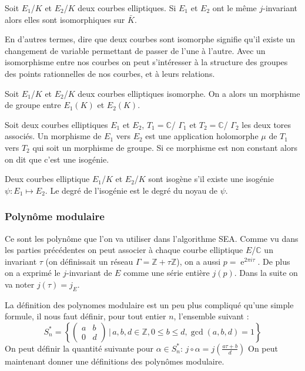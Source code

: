 \documentclass{article}
\DeclareMathOperator{\e}{e}
\begin{document}
\begin{defi}
Soit $E_1$/$K$ et $E_2$/$K$ deux courbes elliptiques. Si $E_1$ et $E_2$ ont le même $j$-invariant alors elles sont isomorphiques sur $\bar{K}$. 
\end{defi}
En d'autres termes, dire que deux courbes sont isomorphe signifie qu'il existe un changement de variable permettant de passer de l'une à l'autre. Avec un isomorphisme entre nos courbes on peut s'intéresser à la structure des groupes des points rationnelles de nos courbes, et à leurs relations.

\begin{prop}
Soit $E_1$/$K$ et $E_2$/$K$ deux courbes elliptiques isomorphe. On a alors un morphisme de groupe entre $E_1(K)$ et $E_2(K)$.
\end{prop}

\begin{defi}
Soit deux courbes elliptiques $E_1$ et $E_2$, $T_1=\mathbb{C}$/ $\Gamma_1$ et $T_2 = \mathbb{C}$/ $\Gamma_2$ les deux tores associés. Un morphisme de $E_1$ vers $E_2$ est une application holomorphe $\mu$ de $T_1$ vers $T_2$ qui soit un morphisme de groupe. Si ce morphisme est non constant alors on dit que c'est une isogénie.
\end{defi}

Deux courbes elliptique $E_1$/$K$ et $E_2$/$K$ sont isogène s'il existe une isogénie $\psi : E_1 \mapsto E_2$. Le degré de l’isogénie est le degré du noyau de $\psi$.


\subsubsection{Polynôme modulaire}
Ce sont les polynôme que l'on va utiliser dans l'algorithme SEA. Comme vu dans les parties précédentes on peut associer à chaque courbe elliptique $E$/$\mathbb{C}$ un invariant $\tau$ (on définissait un réseau $\Gamma = \mathbb{Z}+\tau \mathbb{Z}$), on a aussi $p=\e^{2\pi i \tau}$. De plus on a exprimé le $j$-invariant de $E$ comme une série entière $j(p)$. Dans la suite on va noter $j(\tau) = j_E$.

La définition des polynomes modulaire est un peu plus compliqué qu'une simple formule, il nous faut définir, pour tout entier $n$, l'ensemble suivant : 
\begin{equation*}
S_n^* = \left\{ \begin{pmatrix}
a & b\\
0 & d
\end{pmatrix}
\, | \, a,b,d \in \mathbb{Z}, 0 \leq b \leq d, \gcd(a,b,d) = 1
 \right\} 
\end{equation*}
On peut définir la quantité suivante pour $\alpha \in S_n^* $:  $j \circ \alpha = j(\frac{a\tau +b}{d})$
On peut maintenant donner une définitions des polynômes modulaire.
\end{document}
